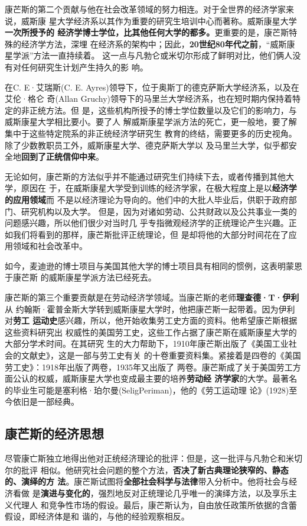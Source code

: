 康芒斯的第二个贡献与他在社会改革领域的努力相连。对于全世界的经济学家来说，威斯康
星大学经济系以其作为重要的研究生培训中心而著称。威斯康星大学\textbf{一次所授予的
  经济学博士学位，比其他任何大学的都多。}更重要的是，康芒斯特殊的经济学方法，深埋
在经济系的架构中；因此，\textbf{20世纪80年代之前}，“威斯康星学派”方法一直持续着。
这一点与凡勃仑或米切尔形成了鲜明对比，他们俩人没有对任何研究生计划产生持久的影
响。

在C. E·艾瑞斯(C. E. Ayres)领导下，位于奥斯丁的德克萨斯大学经济系，以及在艾伦·格仑
奇(Allan Gruchy)领导下的马里兰大学经济系，也在短时期内保持着特定的非正统方法。但
是，这些机构所授予的博士学位数量以及它们的影响力，与威斯康星大学相比要小。要了人
解威斯康星学派方法的死亡，更一般地，要了解集中于这些特定院系的非正统经济学研究生
教育的终结，需要更多的历史视角。除了少数教职员工外，威斯康星大学、德克萨斯大学以
及马里兰大学，似乎都安全地\textbf{回到了正统信仰中来}。

无论如何，康芒斯的方法似乎并不能通过研究生们持续下去，或者传播到其他大学，原因在
于，在威斯康星大学受到训练的经济学家，在极大程度上是以\textbf{经济学的应用领域}而
不是以经济理论为导向的。他们中的大批人毕业后，供职于政府部门、研究机构以及大学。
但是，因为对诸如劳动、公共财政以及公共事业一类的问题感兴趣，所以他们很少对当时几
乎专指微观经济学的正统理论产生兴趣。正如我们将看到的那样，康芒斯批评正统理论，但
是却将他的大部分时间花在了应用领域和社会改革中。

如今，麦迪逊的博士项目与美国其他大学的博士项目具有相同的惯例，这表明蒙恩于康芒斯
的威斯康星学派方法已经死去。

康芒斯的第三个重要贡献是在劳动经济学领域。当康芒斯的老师\textbf{理查德·T·伊利}从
约翰斯·霍普金斯大学转到威斯康星大学时，他把康芒斯一起带着。因为伊利对\textbf{劳工
  运动史}感兴趣，所以，他开始收集劳工史方面的资料。他希望康芒斯根据这些资料研究出
权威性的美国劳工史，这些工作占据了康芒斯在威斯康星大学的大部分学术时间。在其研究
生的大力帮助下，1910年康芒斯出版了《美国工业社会的文献史》，这是一部与劳工史有关
的十卷重要资料集。紧接着是四卷的《美国劳工史》：1918年出版了两卷，1935年又出版了
两卷。康芒斯成了关于美国劳工方面公认的权威，威斯康星大学也变成最主要的培养\textbf{劳动经
济学家}的大学。最著名的毕业生可能是塞利格·珀尔曼(SeligPeriman)，他的《劳工运动理
论》(1928)至今依旧是一部经典。

\subsection{康芒斯的经济思想}

尽管康亡斯独立地得出他对正统经济理论的批评：但是，这一批评与凡勃仑和米切尔的批评
相似。他研究社会问题的整个方法，\textbf{否决了新古典理论狭窄的、静态的、演绎的方
  法}。康芒斯试图将\textbf{全部社会科学与法律}带入分析中。他将社会与经济看做
是\textbf{演进与变化的}，强烈地反对正统理论几乎唯一的演绎方法，以及享乐主义代理人
和竞争性市场的假设。最后，康芒斯认为，自由放任政策所依据的含蕾假设，即经济体是和
谐的，与他的经验观察相反。

